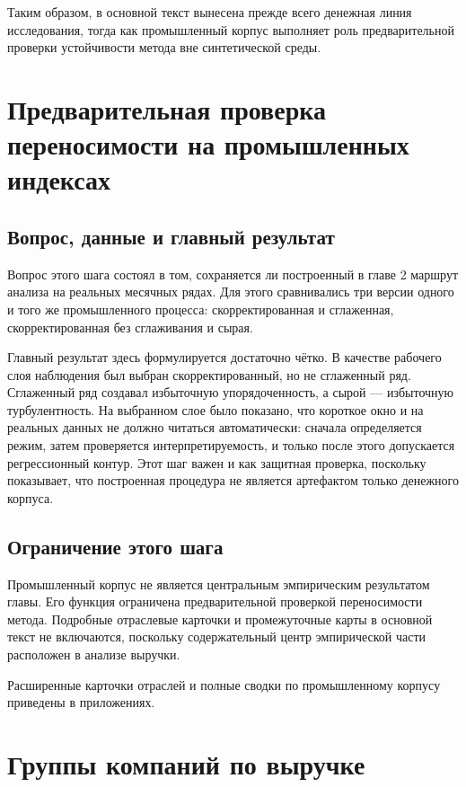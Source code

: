 Таким образом, в основной текст вынесена прежде всего денежная линия исследования, тогда как промышленный корпус выполняет роль предварительной проверки устойчивости метода вне синтетической среды.

\section{Предварительная проверка переносимости на промышленных индексах}
\label{sec:predvaritelnaya-proverka-perenosimosti-na-promyshlennyh-indeksah}

\subsection{Вопрос, данные и главный результат}
\label{sec:vopros-dannye-i-glavnyi-rezultat}

Вопрос этого шага состоял в том, сохраняется ли построенный в главе 2 маршрут анализа на реальных месячных рядах. Для этого сравнивались три версии одного и того же промышленного процесса: скорректированная и сглаженная, скорректированная без сглаживания и сырая.

Главный результат здесь формулируется достаточно чётко. В качестве рабочего слоя наблюдения был выбран скорректированный, но не сглаженный ряд. Сглаженный ряд создавал избыточную упорядоченность, а сырой --- избыточную турбулентность. На выбранном слое было показано, что короткое окно и на реальных данных не должно читаться автоматически: сначала определяется режим, затем проверяется интерпретируемость, и только после этого допускается регрессионный контур. Этот шаг важен и как защитная проверка, поскольку показывает, что построенная процедура не является артефактом только денежного корпуса.

\subsection{Ограничение этого шага}
\label{sec:ogranichenie-etogo-shaga}

Промышленный корпус не является центральным эмпирическим результатом главы. Его функция ограничена предварительной проверкой переносимости метода. Подробные отраслевые карточки и промежуточные карты в основной текст не включаются, поскольку содержательный центр эмпирической части расположен в анализе выручки.

Расширенные карточки отраслей и полные сводки по промышленному корпусу приведены в приложениях.

\section{Группы компаний по выручке}
\label{sec:gruppy-kompanii-po-vyruchke}

